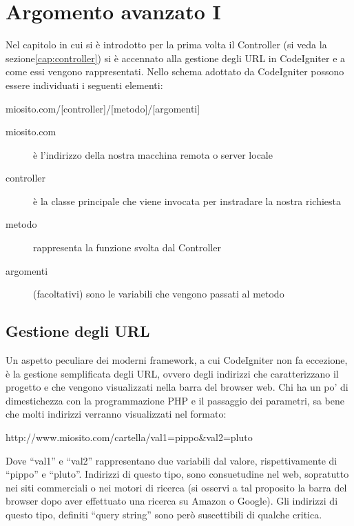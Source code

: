 \chapter{Argomento avanzato I}
\label{cap:url}

Nel capitolo in cui si è introdotto per la prima volta il Controller (si veda la sezione\vref{cap:controller}) si è accennato alla gestione degli \ac{URL} in CodeIgniter e a come essi vengono rappresentati. Nello schema adottato da CodeIgniter possono essere individuati i seguenti elementi:

\begin{code}
miosito.com/[controller]/[metodo]/[argomenti]
\end{code}

\begin{description}
\item [miosito.com] è l'indirizzo della nostra macchina remota o server locale
\item [controller] è la classe principale che viene invocata per instradare la nostra richiesta
\item [metodo] rappresenta la funzione svolta dal Controller 
\item [argomenti] (facoltativi) sono le variabili che vengono passati al metodo
\end{description}

\section{Gestione degli URL}
Un aspetto peculiare dei moderni framework, a cui CodeIgniter non fa eccezione, è la gestione semplificata degli \ac{URL}, ovvero degli indirizzi che caratterizzano il progetto e che vengono visualizzati nella barra del browser web. Chi ha un po' di dimestichezza con la programmazione \ac{PHP} e il passaggio dei parametri, sa bene che molti indirizzi verranno visualizzati nel formato:

\begin{code}
http://www.miosito.com/cartella/val1=pippo&val2=pluto
\end{code}

Dove  ``val1'' e ``val2'' rappresentano due variabili dal valore, rispettivamente di ``pippo'' e ``pluto''. Indirizzi di questo tipo, sono consuetudine nel web, sopratutto nei siti commerciali o nei motori di ricerca (si osservi a tal proposito la barra del browser dopo aver effettuato una ricerca su Amazon o Google). Gli indirizzi di questo tipo, definiti ``query string'' sono però suscettibili di qualche critica.

